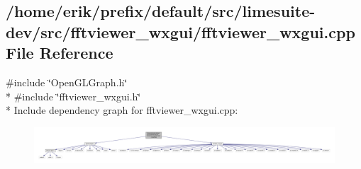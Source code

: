 \subsection{/home/erik/prefix/default/src/limesuite-\/dev/src/fftviewer\+\_\+wxgui/fftviewer\+\_\+wxgui.cpp File Reference}
\label{fftviewer__wxgui_8cpp}
{\ttfamily \#include \char`\"{}Open\+G\+L\+Graph.\+h\char`\"{}}\\*
{\ttfamily \#include \char`\"{}fftviewer\+\_\+wxgui.\+h\char`\"{}}\\*
Include dependency graph for fftviewer\+\_\+wxgui.\+cpp\+:
\nopagebreak
\begin{figure}[H]
\begin{center}
\leavevmode
\includegraphics[width=350pt]{de/d03/fftviewer__wxgui_8cpp__incl}
\end{center}
\end{figure}
